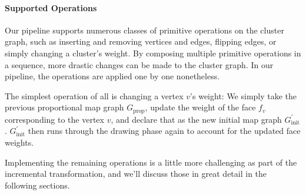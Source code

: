 \paragraph{Supported Operations}

Our pipeline supports numerous classes of primitive operations on the cluster graph, such as inserting and removing vertices and edges, flipping edges, or simply changing a cluster's weight. By composing multiple primitive operations in a sequence, more drastic changes can be made to the cluster graph. In our pipeline, the operations are applied one by one nonetheless.

The simplest operation of all is changing a vertex $v$'s weight: We simply take the previous proportional map graph $G_\text{prop}$, update the weight of the face $f_v$ corresponding to the vertex $v$, and declare that as the new initial map graph $G_\text{init}^\prime$. $G_\text{init}^\prime$ then runs through the drawing phase again to account for the updated face weights.

Implementing the remaining operations is a little more challenging as part of the incremental transformation, and we'll discuss those in great detail in the following sections.

\clearpage

\clearpage

\clearpage

\clearpage

\clearpage

